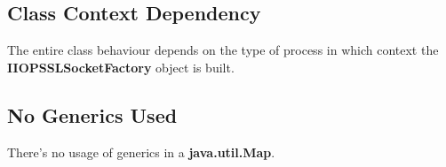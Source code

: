 \subsection{Class Context Dependency}
The entire class behaviour depends on the type of process in which context the \textbf{IIOPSSLSocketFactory} object is built.

\subsection{No Generics Used}
There's no usage of generics in a \textbf{java.util.Map}.

